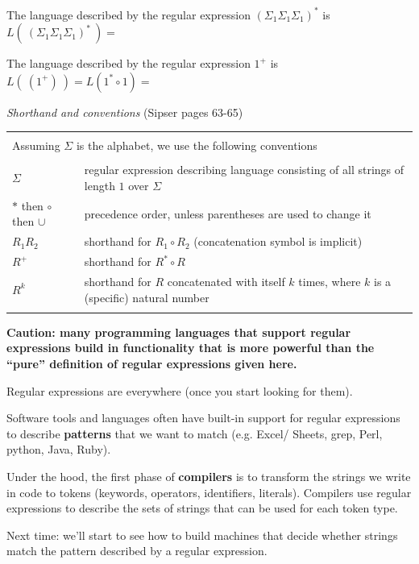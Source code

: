 \documentclass[12pt, oneside]{article}
\begin{document}
The language described by the regular expression $(\Sigma_1 \Sigma_1 \Sigma_1)^*$ 
is $L(~(\Sigma_1 \Sigma_1 \Sigma_1)^*~) = $

\vfill

The language described by the regular expression $1^+$ is $L(~(1^+)~) = L(1^* \circ 1) = $

\vfill


{\it Shorthand and conventions} (Sipser pages 63-65)
\begin{center}
    \begin{tabular}{|ll|}
    \hline
    & \\
    \multicolumn{2}{|l|}{Assuming $\Sigma$ is the alphabet, we use the following conventions}\\
    & \\
    $\Sigma$   & regular  expression describing language consisting of  all strings  of length  $1$ over $\Sigma$\\
    $*$ then $\circ$ then $\cup$   & precedence order, unless parentheses are used to change it\\
    $R_1R_2$ & shorthand  for  $R_1  \circ R_2$ (concatenation symbol is implicit) \\
    $R^+$ & shorthand for $R^* \circ R$ \\
    $R^k$ & shorthand for $R$ concatenated with itself $k$ times, where $k$ is a (specific) natural number\\
    & \\
    \hline
    \end{tabular}
\end{center}

\newpage
{\bf Caution: many programming languages that support regular expressions build in functionality
that is more powerful than the ``pure'' definition of regular expressions given here. }

Regular expressions are everywhere (once you start looking for them).

Software tools and languages often have built-in support for regular expressions to describe
{\bf patterns} that we want to match (e.g. Excel/ Sheets, grep, Perl, python, Java, Ruby).

Under the hood, the first phase of {\bf compilers} is to transform the strings we write 
in code to tokens (keywords, operators, identifiers, literals). Compilers use regular expressions
to describe the sets of strings that can be used for each token type.

Next time: we'll start to see how to build machines that decide whether strings match the pattern
described by a regular expression.
\end{document}
